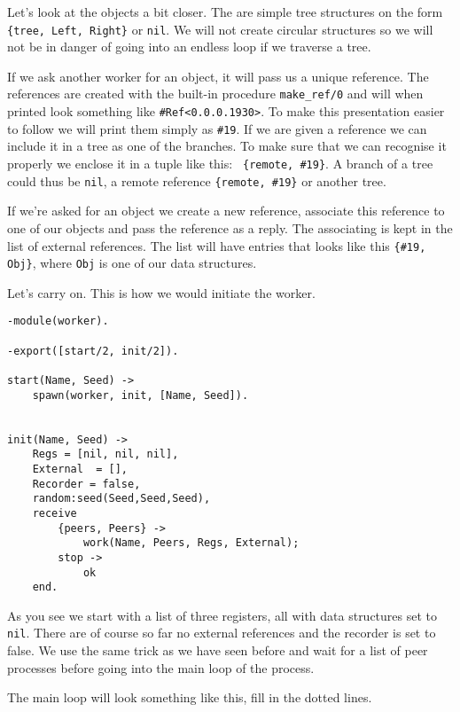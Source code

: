 \documentclass[a4paper,11pt]{article}
\begin{document}
Let's look at the objects a bit closer. The are simple tree structures
on the form {\tt \{tree, Left, Right\}} or {\tt nil}. We will not
create circular structures so we will not be in danger of going into an
endless loop if we traverse a tree. 

If we ask another worker for an object, it will pass us
a unique reference. The references are created with the built-in
procedure {\tt make\_ref/0} and will when printed look something like
{\tt \#Ref<0.0.0.1930>}. To make this presentation easier to follow we
will print them simply as {\tt \#19}. If we are given a reference we
can include it in a tree as one of the branches. To make sure that we
can recognise it properly we enclose it in a tuple like this: {\tt
\{remote, \#19\}}. A branch of a tree could thus be {\tt nil}, a remote
reference {\tt \{remote, \#19\}} or another tree.

If we're asked for an object we create a new reference, associate this
reference to one of our objects and pass the reference as a reply. The
associating is kept in the list of external references. The list will
have entries that looks like this {\tt \{\#19, Obj\}}, where {\tt Obj} is
one of our data structures.

Let's carry on. This is how we would initiate the worker.

\begin{verbatim}
-module(worker).

-export([start/2, init/2]).

start(Name, Seed) ->
    spawn(worker, init, [Name, Seed]).


init(Name, Seed) ->
    Regs = [nil, nil, nil],     
    External  = [], 
    Recorder = false,
    random:seed(Seed,Seed,Seed),
    receive 
        {peers, Peers} ->
            work(Name, Peers, Regs, External);
        stop ->
            ok
    end.
\end{verbatim}

As you see we start with a list of three registers, all with data
structures set to {\tt nil}. There are of course so far no external
references and the recorder is set to false.  We use the same trick
as we have seen before and wait for a list of peer processes before
going into the main loop of the process.

The main loop will look something like this, fill in the dotted lines.
\end{document}
